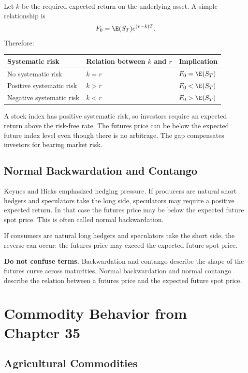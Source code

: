 Let $k$ be the required expected return on the underlying asset. A simple
relationship is
\[
    F_0=\E(S_T)e^{(r-k)T}.
\]
Therefore:

\begin{tabular}{@{}lll@{}}
\toprule
Systematic risk & Relation between $k$ and $r$ & Implication \\
\midrule
No systematic risk & $k=r$ & $F_0=\E(S_T)$ \\
Positive systematic risk & $k>r$ & $F_0<\E(S_T)$ \\
Negative systematic risk & $k<r$ & $F_0>\E(S_T)$ \\
\bottomrule
\end{tabular}

\begin{exmp}
A stock index has positive systematic risk, so investors require an expected
return above the risk-free rate. The futures price can be below the expected
future index level even though there is no arbitrage. The gap compensates
investors for bearing market risk.
\end{exmp}

\subsection{Normal Backwardation and Contango}

Keynes and Hicks emphasized hedging pressure. If producers are natural short
hedgers and speculators take the long side, speculators may require a positive
expected return. In that case the futures price may be below the expected future
spot price. This is often called normal backwardation.

If consumers are natural long hedgers and speculators take the short side, the
reverse can occur: the futures price may exceed the expected future spot price.

\begin{boxD}
\textbf{Do not confuse terms.} Backwardation and contango describe the shape of
the futures curve across maturities. Normal backwardation and normal contango
describe the relation between a futures price and the expected future spot price.
\end{boxD}

\section{Commodity Behavior from Chapter 35}

\subsection{Agricultural Commodities}


